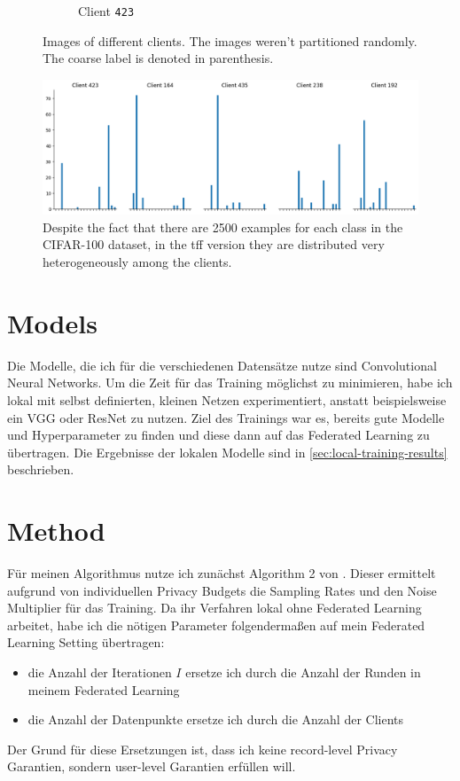 \begin{figure}[tb]
\begin{subfigure}{0.4\textwidth}
        \caption{Client \texttt{423}}
    \end{subfigure}
    	\caption{Images of different clients. The images weren't partitioned randomly. The coarse label is denoted in parenthesis.}
    \label{fig:cifar-images}
\end{figure}

\begin{figure}[tb]
	\centering
	\includegraphics[width=\textwidth]{Bilder/cifar_client_label_distribution.png}
	\caption{Despite the fact that there are 2500 examples for each class in the CIFAR-100 dataset, in the tff version they are distributed very heterogeneously among the clients.}
	\label{fig:cifar-client-label-dist}
\end{figure}

\section{Models}

Die Modelle, die ich für die verschiedenen Datensätze nutze sind Convolutional Neural Networks. Um die Zeit für das Training möglichst zu minimieren, habe ich lokal mit selbst definierten, kleinen Netzen experimentiert, anstatt beispielsweise ein VGG oder ResNet zu nutzen. Ziel des Trainings war es, bereits gute Modelle und Hyperparameter zu finden und diese dann auf das Federated Learning zu übertragen. Die Ergebnisse der lokalen Modelle sind in \autoref{sec:local-training-results} beschrieben.

\section{Method}

Für meinen Algorithmus nutze ich zunächst Algorithm 2 von \textcite{boenisch:2023}. Dieser ermittelt aufgrund von individuellen Privacy Budgets die Sampling Rates und den Noise Multiplier für das Training. Da ihr Verfahren lokal ohne Federated Learning arbeitet, habe ich die nötigen Parameter folgendermaßen auf mein Federated Learning Setting übertragen:

\begin{itemize}
	\item die Anzahl der Iterationen $I$ ersetze ich durch die Anzahl der Runden in meinem Federated Learning
	\item die Anzahl der Datenpunkte ersetze ich durch die Anzahl der Clients
\end{itemize}

Der Grund für diese Ersetzungen ist, dass ich keine record-level Privacy Garantien, sondern user-level Garantien erfüllen will.

